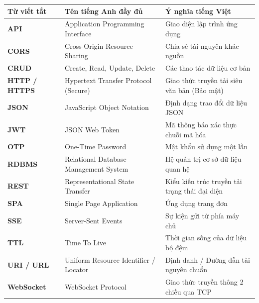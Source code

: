 \documentclass[12pt,a4paper]{extarticle}
\begin{document}
\begin{longtable}{|p{3.5cm}|p{6cm}|p{5.5cm}|}
\hline
\textbf{Từ viết tắt} & \textbf{Tên tiếng Anh đầy đủ} & \textbf{Ý nghĩa tiếng Việt} \\ \hline
\endhead
\textbf{API} & Application Programming Interface & Giao diện lập trình ứng dụng \\ \hline
\textbf{CORS} & Cross-Origin Resource Sharing & Chia sẻ tài nguyên khác nguồn \\ \hline
\textbf{CRUD} & Create, Read, Update, Delete & Các thao tác dữ liệu cơ bản \\ \hline
\textbf{HTTP / HTTPS} & Hypertext Transfer Protocol (Secure) & Giao thức truyền tải siêu văn bản (Bảo mật) \\ \hline
\textbf{JSON} & JavaScript Object Notation & Định dạng trao đổi dữ liệu JSON \\ \hline
\textbf{JWT} & JSON Web Token & Mã thông báo xác thực chuỗi mã hóa \\ \hline
\textbf{OTP} & One-Time Password & Mật khẩu sử dụng một lần \\ \hline
\textbf{RDBMS} & Relational Database Management System & Hệ quản trị cơ sở dữ liệu quan hệ \\ \hline
\textbf{REST} & Representational State Transfer & Kiểu kiến trúc truyền tải trạng thái đại diện \\ \hline
\textbf{SPA} & Single Page Application & Ứng dụng trang đơn \\ \hline
\textbf{SSE} & Server-Sent Events & Sự kiện gửi từ phía máy chủ \\ \hline
\textbf{TTL} & Time To Live & Thời gian sống của dữ liệu bộ đệm \\ \hline
\textbf{URI / URL} & Uniform Resource Identifier / Locator & Định danh / Đường dẫn tài nguyên chuẩn \\ \hline
\textbf{WebSocket} & WebSocket Protocol & Giao thức truyền thông 2 chiều qua TCP \\ \hline
\end{longtable}
\setcounter{table}{0}

\newpage
{}
\listoftables

\newpage
{}
\listoffigures

\newpage
\tableofcontents
\newpage
\end{document}
